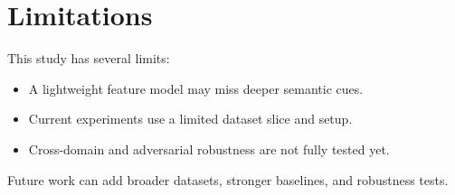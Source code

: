 \section{Limitations}

This study has several limits:
\begin{itemize}
  \item A lightweight feature model may miss deeper semantic cues.
  \item Current experiments use a limited dataset slice and setup.
  \item Cross-domain and adversarial robustness are not fully tested yet.
\end{itemize}

Future work can add broader datasets, stronger baselines, and robustness tests.
